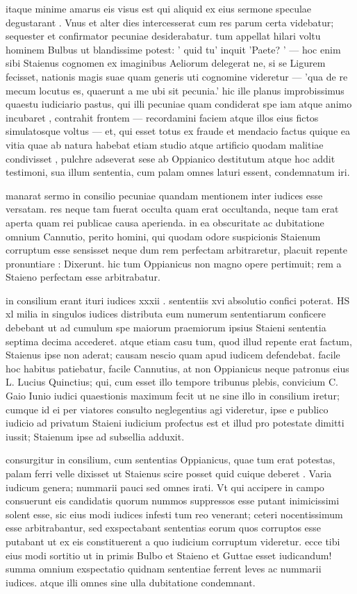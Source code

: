  itaque minime amarus eis visus est qui aliquid ex eius sermone speculae degustarant . Vnus et alter dies intercesserat cum res parum certa videbatur; sequester et confirmator pecuniae desiderabatur. tum appellat hilari voltu hominem Bulbus ut blandissime potest: ' quid tu' inquit 'Paete? ' — hoc enim sibi Staienus cognomen ex imaginibus Aeliorum delegerat ne, si se Ligurem fecisset, nationis magis suae quam generis uti cognomine videretur — 'qua de re mecum locutus es, quaerunt a me ubi sit pecunia.' hic ille planus improbissimus quaestu iudiciario pastus, qui illi pecuniae quam condiderat spe iam atque animo incubaret , contrahit frontem — recordamini faciem atque illos eius fictos simulatosque voltus — et, qui esset totus ex fraude et mendacio factus quique ea vitia quae ab natura habebat etiam studio atque artificio quodam malitiae condivisset , pulchre adseverat sese ab Oppianico destitutum atque hoc addit testimoni, sua illum sententia, cum palam omnes laturi essent, condemnatum iri.

 manarat sermo in consilio pecuniae quandam mentionem inter iudices esse versatam. res neque tam fuerat occulta quam erat occultanda, neque tam erat aperta quam rei publicae causa aperienda. in ea obscuritate ac dubitatione omnium Cannutio, perito homini, qui quodam odore suspicionis Staienum corruptum esse sensisset neque dum rem perfectam arbitraretur, placuit repente pronuntiare : Dixerunt. hic tum Oppianicus non magno opere pertimuit; rem a Staieno perfectam esse arbitrabatur.

 in consilium erant ituri iudices xxxii . sententiis xvi absolutio confici poterat. HS xl milia in singulos iudices distributa eum numerum sententiarum conficere debebant ut ad cumulum spe maiorum praemiorum ipsius Staieni sententia septima decima accederet. atque etiam casu tum, quod illud repente erat factum, Staienus ipse non aderat; causam nescio quam apud iudicem defendebat. facile hoc habitus patiebatur, facile Cannutius, at non Oppianicus neque patronus eius L. Lucius Quinctius; qui, cum esset illo tempore tribunus plebis, convicium C. Gaio Iunio iudici quaestionis maximum fecit ut ne sine illo in consilium iretur; cumque id ei per viatores consulto neglegentius agi videretur, ipse e publico iudicio ad privatum Staieni iudicium profectus est et illud pro potestate dimitti iussit; Staienum ipse ad subsellia adduxit.

 consurgitur in consilium, cum sententias Oppianicus, quae tum erat potestas, palam ferri velle dixisset ut Staienus scire posset quid cuique deberet . Varia iudicum genera; nummarii pauci sed omnes irati. Vt qui accipere in campo consuerunt eis candidatis quorum nummos suppressos esse putant inimicissimi solent esse, sic eius modi iudices infesti tum reo venerant; ceteri nocentissimum esse arbitrabantur, sed exspectabant sententias eorum quos corruptos esse putabant ut ex eis constituerent a quo iudicium corruptum videretur. ecce tibi eius modi sortitio ut in primis Bulbo et Staieno et Guttae esset iudicandum! summa omnium exspectatio quidnam sententiae ferrent leves ac nummarii iudices. atque illi omnes sine ulla dubitatione condemnant.

